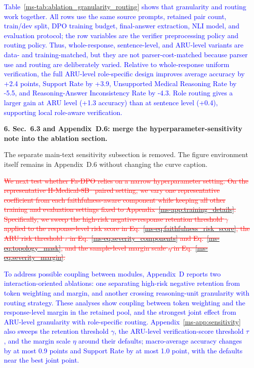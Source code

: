 \documentclass[12pt]{article}
\newcommand{\deleted}[1]{\textcolor{red}{\sout{#1}}}
\newcommand{\added}[1]{\textcolor{blue}{#1}}
\begin{document}
\begin{displayquote}
\added{Table~\ref*{ms-tab:ablation_granularity_routing} shows that granularity and routing
work together. All rows use the same source prompts, retained pair count,
train/dev split, DPO training budget, final-answer extraction, NLI model, and
evaluation protocol; the row variables are the verifier preprocessing policy and
routing policy. Thus, whole-response, sentence-level, and ARU-level variants are
data- and training-matched, but they are not parser-cost-matched because parser use
and routing are deliberately varied. Relative to whole-response uniform
verification, the full ARU-level role-specific design improves average accuracy by
+2.4 points, Support Rate by +3.9, Unsupported Medical Reasoning Rate by -5.5, and
Reasoning-Answer Inconsistency Rate by -4.3. Role routing gives a larger gain at
ARU level (+1.3 accuracy) than at sentence level (+0.4), supporting local
role-aware verification.}
\end{displayquote}

\textbf{6. Sec.~6.3 and Appendix~D.6: merge the hyperparameter-sensitivity note
into the ablation section.}

The separate main-text sensitivity subsection is removed. The figure environment
itself remains in Appendix~D.6 without changing the curve caption.

\begin{displayquote}
\deleted{We next test whether Fa-DPO relies on a narrow hyperparameter setting. On
the representative II-Medical-8B~\cite{intelligentinternet2025iimedical8b}
paired setting, we vary one representative coefficient from each
faithfulness-aware component while keeping all other training and evaluation
settings fixed to Appendix~\ref*{ms-app:training_details}. Specifically, we sweep
the high-risk negative-response retention threshold $\gamma$ applied to the
response-level risk score in Eq.~\ref*{ms-eq:faithfulness_risk_score}, the ARU
risk threshold $\tau$ in Eq.~\ref*{ms-eq:severity_components} and
Eq.~\ref*{ms-eq:topology_mask}, and the sample-level margin scale $\eta$ in
Eq.~\ref*{ms-eq:severity_margin}.}

\added{To address possible coupling between modules, Appendix~D reports two
interaction-oriented ablations: one separating high-risk negative retention from
token weighting and margin, and another crossing reasoning-unit granularity with
routing strategy. These analyses show coupling between token weighting and the
response-level margin in the retained pool, and the strongest joint effect from
ARU-level granularity with role-specific routing.
Appendix~\ref*{ms-app:sensitivity} also sweeps the retention threshold $\gamma$,
the ARU-level verification-score threshold $\tau$, and the margin scale $\eta$
around their defaults; macro-average accuracy changes by at most 0.9 points and
Support Rate by at most 1.0 point, with the defaults near the best joint point.}
\end{displayquote}
\end{document}
